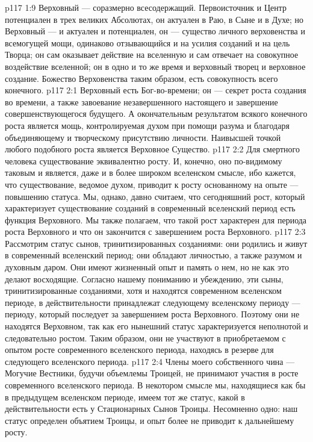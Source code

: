 \vs p117 1:9 Верховный --- соразмерно всесодержащий. Первоисточник и Центр потенциален в трех великих Абсолютах, он актуален в Раю, в Сыне и в Духе; но Верховный --- и актуален и потенциален, он --- существо личного верховенства и всемогущей мощи, одинаково отзывающийся и на усилия созданий и на цель Творца; он сам оказывает действие на вселенную и сам отвечает на совокупное воздействие вселенной; он в одно и то же время и верховный творец и верховное создание. Божество Верховенства таким образом, есть совокупность всего конечного.
\vs p117 2:1 Верховный есть Бог\hyp{}во\hyp{}времени; он --- секрет роста создания во времени, а также завоевание незавершенного настоящего и завершение совершенствующегося будущего. А окончательным результатом всякого конечного роста является мощь, контролируемая духом при помощи разума и благодаря объединяющему и творческому присутствию личности. Наивысшей точкой любого подобного роста является Верховное Существо.
\vs p117 2:2 Для смертного человека существование эквивалентно росту. И, конечно, оно по\hyp{}видимому таковым и является, даже и в более широком вселенском смысле, ибо кажется, что существование, ведомое духом, приводит к росту основанному на опыте --- повышению статуса. Мы, однако, давно считаем, что сегодняшний рост, который характеризует существование созданий в современный вселенский период есть функция Верховного. Мы также полагаем, что такой рост характерен для периода роста Верховного и что он закончится с завершением роста Верховного.
\vs p117 2:3 \pc Рассмотрим статус сынов, тринитизированных созданиями: они родились и живут в современный вселенский период; они обладают личностью, а также разумом и духовным даром. Они имеют жизненный опыт и память о нем, но не  как это делают восходящие. Согласно нашему пониманию и убеждению, эти сыны, тринитизированные созданиями, хотя и находятся  современном вселенском периоде, в действительности принадлежат  следующему вселенскому периоду --- периоду, который последует за завершением роста Верховного. Поэтому они не находятся  Верховном, так как его нынешний статус характеризуется неполнотой и следовательно ростом. Таким образом, они не участвуют в приобретаемом с опытом росте современного вселенского периода, находясь в резерве для следующего вселенского периода.
\vs p117 2:4 Члены моего собственного чина --- Могучие Вестники, будучи объемлемы Троицей, не принимают участия в росте современного вселенского периода. В некотором смысле мы, находящиеся как бы в предыдущем вселенском периоде, имеем тот же статус, какой в действительности есть у Стационарных Сынов Троицы. Несомненно одно: наш статус определен объятием Троицы, и опыт более не приводит к дальнейшему росту.
